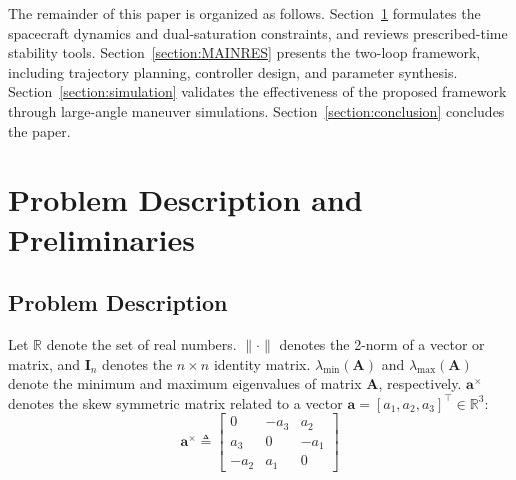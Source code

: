 \documentclass[journal]{new-aiaa}
\begin{document}
The remainder of this paper is organized as follows. 
Section~\ref{section:PROBLEM} formulates the spacecraft dynamics and dual-saturation constraints, 
and reviews prescribed-time stability tools. 
Section~\ref{section:MAINRES} presents the two-loop framework, including trajectory planning, 
controller design, and parameter synthesis. Section~\ref{section:simulation} validates the effectiveness of the proposed framework
through large-angle maneuver simulations. Section~\ref{section:conclusion} concludes the paper.


\section{Problem Description and Preliminaries}
\label{section:PROBLEM}

\subsection{Problem Description}
Let $\mathbb{R}$ denote the set of real numbers. 
$\|\cdot\|$ denotes the 2-norm of a vector or matrix, and 
$\boldsymbol{I}_n$ denotes the $n\times n$ identity matrix.
$\lambda_{\min}(\boldsymbol{A})$ and $\lambda_{\max}(\boldsymbol{A})$ denote the minimum and maximum eigenvalues 
of matrix $\boldsymbol{A}$, respectively.
$\boldsymbol{a}^{\times}$ denotes the skew symmetric matrix related to a
vector $\boldsymbol{a}=[a_1,a_2,a_3]^\top\in\mathbb{R}^3$:
\[
\boldsymbol{a}^{\times} \triangleq
\begin{bmatrix}
0 & -a_3 & a_2\\
a_3 & 0 & -a_1\\
-a_2 & a_1 & 0
\end{bmatrix}
\]
\end{document}
